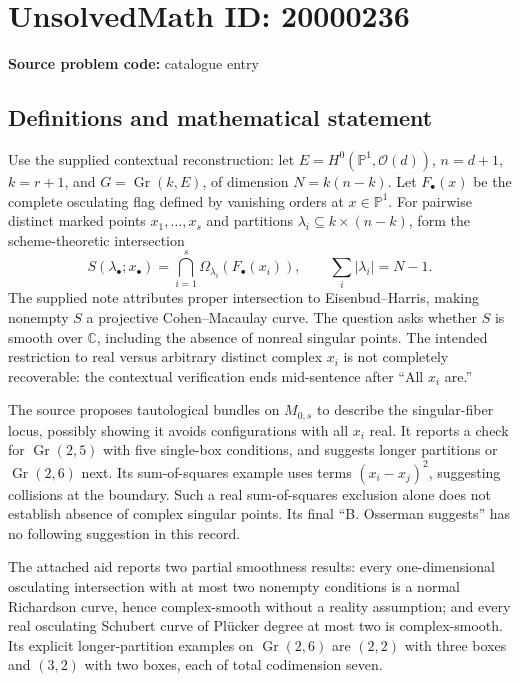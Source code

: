 \documentclass[11pt]{article}
\newcommand{\C}{\mathbb{C}}
\newcommand{\PP}{\mathbb{P}}
\begin{document}
\section*{UnsolvedMath ID: 20000236}
\textbf{Source problem code:} catalogue entry
\subsection{Definitions and mathematical statement}
Use the supplied contextual reconstruction: let \(E=H^0(\PP^1,\mathcal O(d))\), \(n=d+1\), \(k=r+1\), and \(G=\operatorname{Gr}(k,E)\), of dimension \(N=k(n-k)\). Let \(F_\bullet(x)\) be the complete osculating flag defined by vanishing orders at \(x\in\PP^1\). For pairwise distinct marked points \(x_1,\ldots,x_s\) and partitions \(\lambda_i\subseteq k\times(n-k)\), form the scheme-theoretic intersection
\[
S(\lambda_\bullet;x_\bullet)=\bigcap_{i=1}^s
\Omega_{\lambda_i}(F_\bullet(x_i)),\qquad
\sum_i|\lambda_i|=N-1.
\]
The supplied note attributes proper intersection to Eisenbud--Harris, making nonempty \(S\) a projective Cohen--Macaulay curve. The question asks whether \(S\) is smooth over \(\C\), including the absence of nonreal singular points. The intended restriction to real versus arbitrary distinct complex \(x_i\) is not completely recoverable: the contextual verification ends mid-sentence after ``All \(x_i\) are.''

The source proposes tautological bundles on \(M_{0,s}\) to describe the singular-fiber locus, possibly showing it avoids configurations with all \(x_i\) real. It reports a check for \(\operatorname{Gr}(2,5)\) with five single-box conditions, and suggests longer partitions or \(\operatorname{Gr}(2,6)\) next. Its sum-of-squares example uses terms \((x_i-x_j)^2\), suggesting collisions at the boundary. Such a real sum-of-squares exclusion alone does not establish absence of complex singular points. Its final ``B. Osserman suggests'' has no following suggestion in this record.

The attached aid reports two partial smoothness results: every one-dimensional osculating intersection with at most two nonempty conditions is a normal Richardson curve, hence complex-smooth without a reality assumption; and every real osculating Schubert curve of Pl\"ucker degree at most two is complex-smooth. Its explicit longer-partition examples on \(\operatorname{Gr}(2,6)\) are \((2,2)\) with three boxes and \((3,2)\) with two boxes, each of total codimension seven.
\end{document}
